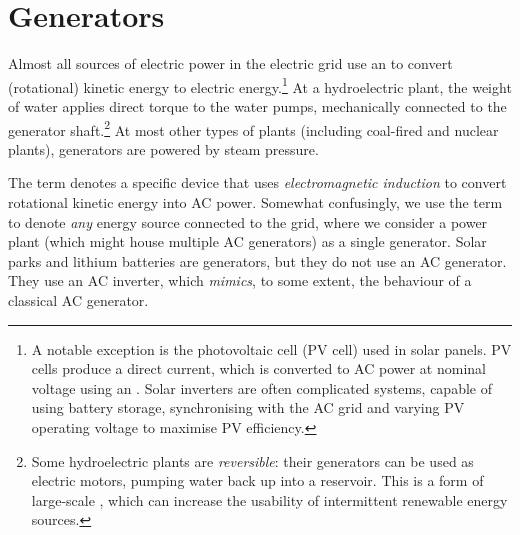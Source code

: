 \documentclass[main.tex]{subfiles}
\begin{document}
\section{Generators}
Almost all sources of electric power in the electric grid use an  to convert (rotational) kinetic energy to electric energy.\footnote{A notable exception is the photovoltaic cell (PV cell) used in solar panels. PV cells produce a direct current, which is converted to AC power at nominal voltage using an . Solar inverters are often complicated systems, capable of using battery storage, synchronising with the AC grid and varying PV operating voltage to maximise PV efficiency.} 
At a hydroelectric plant, the weight of water applies direct torque to the water pumps, mechanically connected to the generator shaft.\footnote{Some hydroelectric plants are \emph{reversible}: their generators can be used as electric motors, pumping water back up into a reservoir. This is a form of large-scale , which can increase the usability of intermittent renewable energy sources.}
At most other types of plants (including coal-fired and nuclear plants), generators are powered by steam pressure. 

The term  denotes a specific device that uses \emph{electromagnetic induction} to convert rotational kinetic energy into AC power. Somewhat confusingly, we use the term  to denote \emph{any} energy source connected to the grid, where we consider a power plant (which might house multiple AC generators) as a single generator. Solar parks and lithium batteries are generators, but they do not use an AC generator. They use an AC inverter, which \emph{mimics}, to some extent, the behaviour of a classical AC generator.
 
\end{document}
